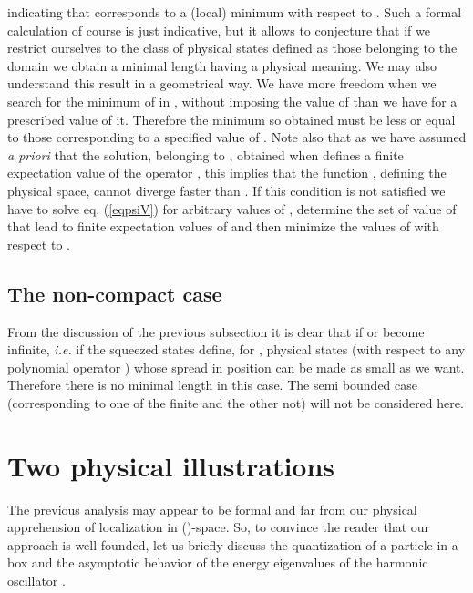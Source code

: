 \documentclass[a4paper,10pt]{article}
\providecommand{\x}{\mbox{\rm{\bf \^ x}}}
\providecommand{\p}{\mbox{\rm{\bf \^ p}}}
\providecommand{\cD}{{\cal D}}
\begin{document}
indicating that \myHighlight{$\Delta\x^{min}|_{b=0}$}\coordHE{} corresponds to a (local)
minimum with respect to \myHighlight{$\gamma$}\coordHE{}. Such a formal calculation of
course is just indicative, but it allows to conjecture that if we
restrict ourselves to the class of physical states defined as
those belonging to the domain \myHighlight{$\cD(\hat x)$}\coordHE{} we obtain a minimal
length having a physical meaning. We may also understand this
result in a geometrical way. We have more freedom when we search
for the minimum of \coordHE{} in \myHighlight{$\cD(\hat x)$}\coordHE{}, without imposing the
value of \myHighlight{$\gamma$}\coordHE{} than we have for a prescribed value of it.
Therefore the minimum so obtained must be less or equal to those
corresponding to a specified value of \myHighlight{$\gamma$}\coordHE{}. Note also that as
we have assumed {\it a priori} that the solution, belonging to
\myHighlight{$\cD(\hat x)$}\coordHE{}, obtained when \coordHE{} defines a finite expectation
value of the operator \myHighlight{$v(\p)$}\coordHE{}, this implies that the function
\coordHE{}, defining the physical space, cannot diverge faster than
\coordHE{}. If this condition is not satisfied we have to
solve eq. (\ref{eqpsiV}) for arbitrary values of \coordHE{}, determine
the set of value of \coordHE{} that lead to finite expectation values of
\myHighlight{$v(\p)$}\coordHE{} and then minimize the values of \myHighlight{$\Delta\x_b$}\coordHE{} with respect
to \coordHE{}.
\subsection{The non-compact case}
From the discussion of the previous subsection it is clear that if
\myHighlight{$\alpha_-$}\coordHE{} or \myHighlight{$\alpha_+$}\coordHE{} become infinite, {\it i.e.} if \coordHE{}
the squeezed states define, for \coordHE{}, physical states (with
respect to any polynomial operator \myHighlight{$v(\p)$}\coordHE{}) whose spread in
position can be made as small as we want. Therefore there is no
minimal length in this case. The semi bounded case (corresponding
to one of the \myHighlight{$\alpha$}\coordHE{} finite and the other not) will not be
considered here.
\section{Two physical illustrations}
The previous analysis may appear to be formal and far from our
physical apprehension of localization in (\coordHE{})-space. So, to
convince the reader that our approach is well founded, let us
briefly discuss the quantization of a particle in a box
\cite{BGLS} and the asymptotic behavior of the energy eigenvalues
of the harmonic oscillator \cite{K2}.
\end{document}
